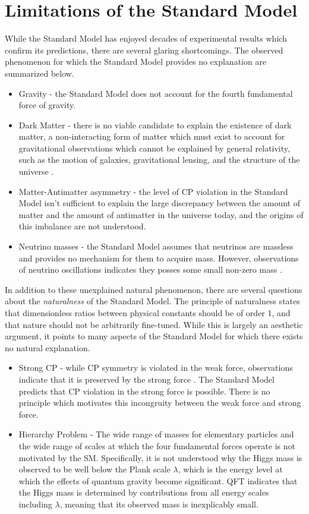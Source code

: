 \section{Limitations of the Standard Model}
\label{sec:lim_sm}

While the Standard Model has enjoyed decades of experimental results which confirm its predictions, there are several glaring shortcomings. The observed phenomenon for which the Standard Model provides no explanation are summarized below.

\begin{itemize}
  \item Gravity - the Standard Model does not account for the fourth fundamental force of gravity.
  \item Dark Matter - there is no viable candidate to explain the existence of dark matter, a non-interacting form of matter which must exist to account for gravitational observations which cannot be explained by general relativity, such as the motion of galaxies, gravitational lensing, and the structure of the universe \cite{dm}.
  \item Matter-Antimatter asymmetry - the level of CP violation in the Standard Model isn't sufficient to explain the large discrepancy between the amount of matter and the amount of antimatter in the universe today, and the origins of this imbalance are not understood.
  \item Neutrino masses - the Standard Model assumes that neutrinos are massless and provides no mechanism for them to acquire mass. However, observations of neutrino oscillations indicates they posses some small non-zero mass \cite{neutrino_osc}.
\end{itemize}

In addition to these unexplained natural phenomenon, there are several questions about the \textit{naturalness} of the Standard Model. The principle of naturalness states that dimensionless ratios between physical constants should be of order 1, and that nature should not be arbitrarily fine-tuned. While this is largely an aesthetic argument, it points to many aspects of the Standard Model for which there exists no natural explanation.

\begin{itemize}
  \item Strong CP - while CP symmetry is violated in the weak force, observations indicate that it is preserved by the strong force \cite{strongCP}. The Standard Model predicts that CP violation in the strong force is possible. There is no principle which motivates this incongruity between the weak force and strong force.
  \item Hierarchy Problem - The wide range of masses for elementary particles and the wide range of scales at which the four fundamental forces operate is not motivated by the SM. Specifically, it is not understood why the Higgs mass is observed to be well below the Plank scale $\lambda$, which is the energy level at which the effects of quantum gravity become significant. QFT indicates that the Higgs mass is determined by contributions from all energy scales including $\lambda$, meaning that its observed mass is inexplicably small.
\end{itemize}

